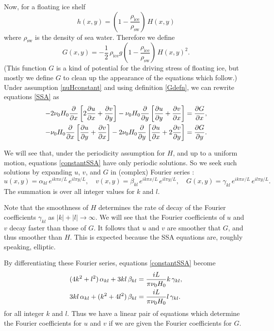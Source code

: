 \documentclass[12pt]{amsart}%
\theoremstyle{plain}
\theoremstyle{definition}
\newcommand{\ddx}[1]{\ensuremath{\frac{\partial #1}{\partial x}}}
\newcommand{\ddy}[1]{\ensuremath{\frac{\partial #1}{\partial y}}}
\newcommand{\rhoi}{\ensuremath{\rho_{\text{ice}}}}
\newcommand{\rhosw}{\ensuremath{\rho_{\text{sw}}}}
\begin{document}
Now, for a floating ice shelf 
	$$h(x,y) = \left(1-\frac{\rhoi}{\rhosw}\right)\, H(x,y)$$
where $\rhosw$ is the density of sea water.  Therefore we define
\begin{equation}\label{Gdefn}
G(x,y) = - \frac{1}{2}\, \rhoi g \left(1-\frac{\rhoi}{\rhosw}\right)\,  H(x,y)^2.
\end{equation}
(This function $G$ is a kind of potential for the driving stress of floating ice, but mostly we define $G$ to clean up the appearance of the equations which follow.)  Under assumption \eqref{nuHconstant} and using definition \eqref{Gdefn}, we can rewrite equations \eqref{SSA} as
\begin{align}\label{constantSSA}
 - 2 \nu_0 H_0 \ddx{}\left[2 \ddx{u} + \ddy{v}\right]
 - \nu_0 H_0 \ddy{}\left[\ddy{u} + \ddx{v}\right] &= \ddx{G}, \\
 - \nu_0 H_0 \ddx{}\left[\ddy{u} + \ddx{v}\right]
 - 2 \nu_0 H_0 \ddy{}\left[\ddx{u} + 2 \ddy{v}\right] &= \ddy{G}.\notag
\end{align}

We will see that, under the periodicity assumption for $H$, and up to a uniform motion, equations \eqref{constantSSA} have only periodic solutions.  So we seek such solutions by expanding $u$, $v$, and $G$ in (complex) Fourier series \cite{BrownChurchill}:
	$$u(x,y) = \alpha_{kl}\, e^{ik\pi x/L}\, e^{il\pi y/L}, \quad v(x,y) = \beta_{kl}\, e^{ik\pi x/L}\, e^{il\pi y/L}, \quad G(x,y) = \gamma_{kl}\, e^{ik\pi x/L}\, e^{il\pi y/L}.$$
The summation is over all integer values for $k$ and $l$.

Note that the smoothness of $H$ determines the rate of decay of the Fourier coefficients $\gamma_{kl}$ as $|k|+|l|\to\infty$.  We will see that the Fourier coefficients of $u$ and $v$ decay faster than those of $G$.  It follows that $u$ and $v$ are smoother that $G$, and thus smoother than $H$.  This is expected because the SSA equations are, roughly speaking, elliptic.

By differentiating these Fourier series, equations \eqref{constantSSA} become
\begin{align}\label{fourierSSA}
(4 k^2 + l^2) \,\alpha_{kl}  + 3 kl \,\beta_{kl}  &= \frac{iL}{\pi \nu_0 H_0} k\, \gamma_{kl}, \\
3 kl \,\alpha_{kl}  + (k^2 + 4 l^2) \,\beta_{kl}  &= \frac{iL}{\pi \nu_0 H_0} l\, \gamma_{kl}. \notag
\end{align}
for all integer $k$ and $l$.  Thus we have a linear pair of equations which determine the Fourier coefficients for $u$ and $v$ if we are given the Fourier coefficients for $G$.
\end{document}
